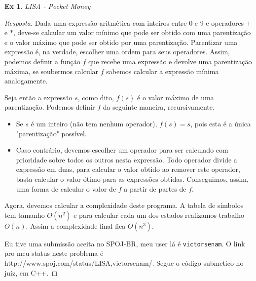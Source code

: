 \documentclass[12pt]{article}
\newcounter{exCounter}
\newtheorem{ex}[exCounter]{Ex}
\begin{document}
\begin{ex}
LISA - Pocket Money
\end{ex}

\begin{proof}[Resposta]
Dada uma expressão aritmética com inteiros entre 0 e 9 e operadores $+$ e $*$, deve-se calcular um valor mínimo que pode ser obtido com uma parentização e o valor máximo que pode ser obtido por uma parentização. Parentizar uma expressão é, na verdade, escolher uma ordem para seus operadores. Assim, podemos definir a função $f$ que recebe uma expressão e devolve uma parentização máxima, se soubermos calcular $f$ sabemos calcular a expressão mínima analogamente.

Seja então a expressão $s$, como dito, $f(s)$ é o valor máximo de uma parentização. Podemos definir $f$ da seguinte maneira, recursivamente.
\begin{itemize}
    \item Se $s$ é um inteiro (não tem nenhum operador), $f(s) = s$, pois esta é a única "parentização" possível.
    \item Caso contrário, devemos escolher um operador para ser calculado com prioridade sobre todos os outros nesta expressão. Todo operador divide a expressão em duas, para calcular o valor obtido ao remover este operador, basta calcular o valor ótimo para as expressões obtidas. Conseguimos, assim, uma forma de calcular o valor de $f$ a partir de partes de $f$.
\end{itemize}

Agora, devemos calcular a complexidade deste programa. A tabela de símbolos tem tamanho $O(n^2)$ e para calcular cada um dos estados realizamos trabalho $O(n)$. Assim a complexidade final fica $O(n^3)$.

Eu tive uma submissão aceita no SPOJ-BR, meu user lá é \texttt{victorsenam}. O link pro meu status neste problema é http://www.spoj.com/status/LISA,victorsenam/. Segue o código submetico no juíz, em C++.
\end{proof}
\end{document}

